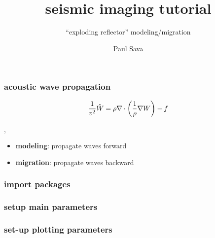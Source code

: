 


\title[]{seismic imaging tutorial}
\subtitle{``exploding reflector'' modeling/migration}
\author[]{Paul Sava}
\date{}
\logo{}

\def\big#1{\begin{center} \LARGE \textbf{#1} \end{center}}
\def\cen#1{\begin{center}        \textbf{#1} \end{center}}

 { \cwpcover }


\begin{frame} \frametitle{acoustic wave propagation}

\[
\frac{1}{v^2} \ddot{W} = 
\rho \nabla \cdot {\left (\frac{1}{\rho} \nabla {W} \right)} -f
\]

\sep

\begin{itemize}
   \item \textbf{modeling}: propagate waves forward
   \item \textbf{migration}: propagate waves backward 
\end{itemize}

\end{frame}
\cwpnote{}

\begin{frame} \frametitle{import packages}

\end{frame}
\cwpnote{}

\begin{frame} \frametitle{setup main parameters}

\end{frame}
\cwpnote{}

\begin{frame} \frametitle{set-up plotting parameters}

\end{frame}
\cwpnote{}

